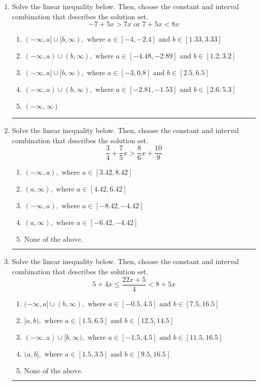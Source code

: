 \documentclass[14pt]{extbook}
\newcommand{\litem}[1]{\item#1\hspace*{-1cm}\rule{\textwidth}{0.4pt}}
\begin{document}
\begin{enumerate}
{\begin{enumerate}[label=\Alph*.]
\end{enumerate} }
\litem{
Solve the linear inequality below. Then, choose the constant and interval combination that describes the solution set.\[ -7 + 5 x > 7 x \text{ or } 7 + 5 x < 8 x \]\begin{enumerate}[label=\Alph*.]
\item \( (-\infty, a] \cup [b, \infty), \text{ where } a \in [-4, -2.4] \text{ and } b \in [1.33, 3.33] \)
\item \( (-\infty, a) \cup (b, \infty), \text{ where } a \in [-4.48, -2.89] \text{ and } b \in [1.2, 3.2] \)
\item \( (-\infty, a] \cup [b, \infty), \text{ where } a \in [-3, 0.8] \text{ and } b \in [2.5, 6.5] \)
\item \( (-\infty, a) \cup (b, \infty), \text{ where } a \in [-2.81, -1.53] \text{ and } b \in [2.6, 5.3] \)
\item \( (-\infty, \infty) \)

\end{enumerate} }
\litem{
Solve the linear inequality below. Then, choose the constant and interval combination that describes the solution set.\[ \frac{3}{4} + \frac{7}{5} x > \frac{8}{6} x + \frac{10}{9} \]\begin{enumerate}[label=\Alph*.]
\item \( (-\infty, a), \text{ where } a \in [3.42, 8.42] \)
\item \( (a, \infty), \text{ where } a \in [4.42, 6.42] \)
\item \( (-\infty, a), \text{ where } a \in [-8.42, -4.42] \)
\item \( (a, \infty), \text{ where } a \in [-6.42, -4.42] \)
\item \( \text{None of the above}. \)

\end{enumerate} }
\litem{
Solve the linear inequality below. Then, choose the constant and interval combination that describes the solution set.\[ 5 + 4 x \leq \frac{22 x + 5}{4} < 8 + 5 x \]\begin{enumerate}[label=\Alph*.]
\item \( (-\infty, a] \cup (b, \infty), \text{ where } a \in [-0.5, 4.5] \text{ and } b \in [7.5, 16.5] \)
\item \( [a, b), \text{ where } a \in [1.5, 6.5] \text{ and } b \in [12.5, 14.5] \)
\item \( (-\infty, a) \cup [b, \infty), \text{ where } a \in [-1.5, 4.5] \text{ and } b \in [11.5, 16.5] \)
\item \( (a, b], \text{ where } a \in [1.5, 3.5] \text{ and } b \in [9.5, 16.5] \)
\item \( \text{None of the above.} \)


\end{enumerate}}
\end{enumerate}
\end{document}
